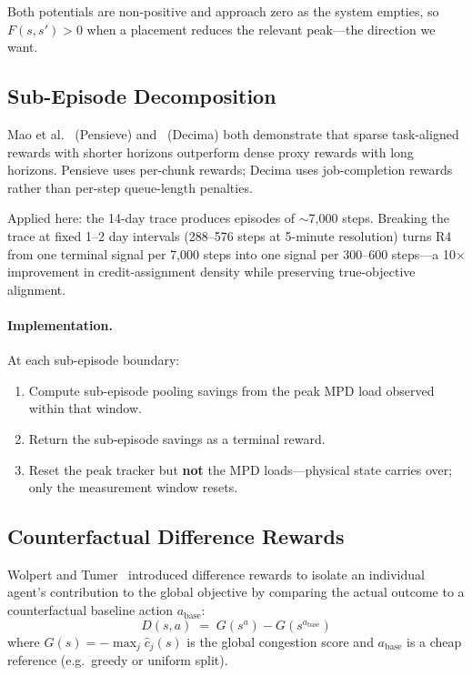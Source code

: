 \documentclass[11pt]{article}
\begin{document}
Both potentials are non-positive and approach zero as the system empties,
so $F(s,s') > 0$ when a placement reduces the relevant peak---the
direction we want.

\subsection{Sub-Episode Decomposition}
\label{sec:subepisodes}

Mao et al.~\cite{mao2017pensieve} (Pensieve) and~\cite{mao2019decima}
(Decima) both demonstrate that sparse task-aligned rewards with shorter
horizons outperform dense proxy rewards with long horizons.  Pensieve
uses per-chunk rewards; Decima uses job-completion rewards rather than
per-step queue-length penalties.

Applied here: the 14-day trace produces episodes of $\sim$7{,}000 steps.
Breaking the trace at fixed 1--2 day intervals (288--576 steps at
5-minute resolution) turns R4 from one terminal signal per 7{,}000 steps
into one signal per 300--600 steps---a 10$\times$ improvement in
credit-assignment density while preserving true-objective alignment.

\paragraph{Implementation.}
At each sub-episode boundary:
\begin{enumerate}
  \item Compute sub-episode pooling savings from the peak MPD load observed
        within that window.
  \item Return the sub-episode savings as a terminal reward.
  \item Reset the peak tracker but \textbf{not} the MPD loads---physical
        state carries over; only the measurement window resets.
\end{enumerate}

\subsection{Counterfactual Difference Rewards}
\label{sec:counterfactual}

Wolpert and Tumer~\cite{wolpert2002diff} introduced difference rewards to
isolate an individual agent's contribution to the global objective by
comparing the actual outcome to a counterfactual baseline action
$a_{\text{base}}$:
\begin{equation}
  D(s, a)
  \;=\;
  G(s^{a}) - G(s^{a_{\text{base}}})
  \label{eq:diff-reward}
\end{equation}
where $G(s) = -\max_j \hat{c}_j(s)$ is the global congestion score and
$a_{\text{base}}$ is a cheap reference (e.g.\ greedy or uniform split).
\end{document}
